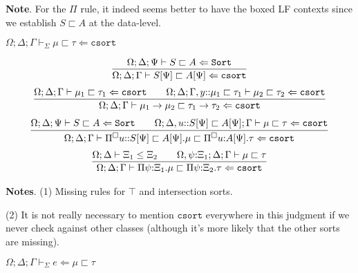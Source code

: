 \documentclass[letterpaper, 11pt]{article}
\newcommand{\Lar}{\Leftarrow}
\newcommand{\rar}{\rightarrow}
\newcommand{\Sort}{\texttt{Sort}}
\newcommand{\csort}{\texttt{csort}}
\begin{document}
    \textbf{Note}.  For the $\Pi$ rule, it indeed seems better to have the boxed LF contexts since we establish $S \sqsubset A$ at the data-level.

    $\boxed{\Omega; \Delta; \Gamma \vdash_\Sigma \mu \sqsubset \tau \Lar \csort}$

    \begin{align*}
      \infer{\Omega; \Delta; \Gamma \vdash S[\Psi] \sqsubset A[\Psi] \Lar \csort}
            {\Omega; \Delta; \Psi \vdash S \sqsubset A \Lar \Sort}
    \end{align*}
    \begin{align*}
      \infer{\Omega; \Delta; \Gamma \vdash \mu_1 \rar \mu_2 \sqsubset \tau_1 \rar \tau_2 \Lar \csort}
            {
              \Omega; \Delta; \Gamma \vdash \mu_1 \sqsubset \tau_1 \Lar \csort
              &&
              \Omega; \Delta; \Gamma, y{::}\mu_1 \sqsubset \tau_1 \vdash \mu_2 \sqsubset \tau_2 \Lar \csort
            }
    \end{align*}
    \begin{align*}
      \infer{\Omega; \Delta; \Gamma \vdash \Pi^\square u{::} S[\Psi] \sqsubset A[\Psi]. \mu \sqsubset \Pi^\square u{:}A[\Psi]. \tau \Lar \csort}
            {
              \Omega; \Delta; \Psi \vdash S \sqsubset A \Lar \Sort
              &&
              \Omega; \Delta, u{::}S[\Psi] \sqsubset A[\Psi]; \Gamma \vdash \mu \sqsubset \tau \Lar \csort
            }
    \end{align*}
    \begin{align*}
      \infer{\Omega; \Delta; \Gamma \vdash\Pi \psi{:}\Xi_1 . \mu \sqsubset \Pi \psi{:}\Xi_2 . \tau \Lar \csort}
            {
              \Omega; \Delta \vdash \Xi_1 \leq \Xi_2
              &&
              \Omega, \psi{:}\Xi_1; \Delta; \Gamma \vdash \mu \sqsubset \tau
            }
    \end{align*}

    \textbf{Notes}. (1) Missing rules for $\top$ and intersection sorts.

    (2) It is not really necessary to mention $\csort$ everywhere in this judgment if we never check against other classes (although it's
    more likely that the other sorts are missing).

    $\boxed{\Omega; \Delta; \Gamma \vdash_\Sigma e \Lar \mu \sqsubset \tau}$
\end{document}
